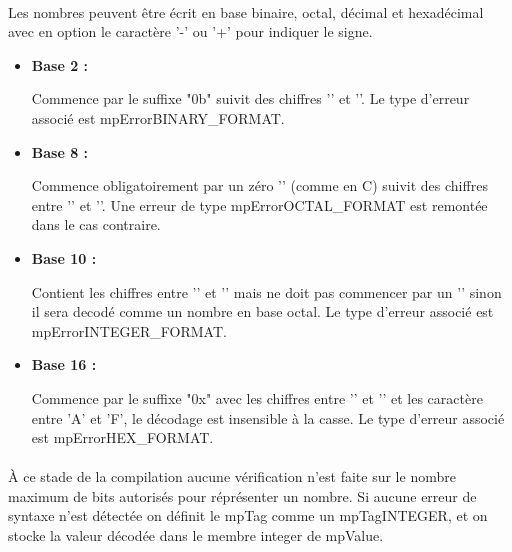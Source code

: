 \documentclass[12pt]{report} %
\begin{document}
    \paragraph{}
    Les nombres peuvent être écrit en base binaire, octal, décimal et hexadécimal avec en option le caractère '{\ttfamily -}' ou '{\ttfamily +}' pour indiquer le signe.
    \begin{itemize}
        \setlength\itemsep{1em}

        \item \textbf{Base 2 :}

        Commence par le suffixe "{\ttfamily 0b}" suivit des chiffres '{}' et '{}'. Le type d'erreur associé est {\ttfamily mpErrorBINARY\_FORMAT}.

        \item \textbf{Base 8 :}

        Commence obligatoirement par un zéro '{}' (comme en {\ttfamily C}) suivit des chiffres entre '{}' et '{}'. Une erreur de type {\ttfamily mpErrorOCTAL\_FORMAT} est remontée dans le cas contraire.

        \item \textbf{Base 10 :}

        Contient les chiffres entre '{}' et '{}' mais ne doit pas commencer par un '{}' sinon il sera decodé comme un nombre en base octal. Le type d'erreur associé est {\ttfamily mpErrorINTEGER\_FORMAT}.

        \item \textbf{Base 16 :}

        Commence par le suffixe "{\ttfamily 0x}" avec les chiffres entre '{}' et '{}' et les caractère entre '{\ttfamily A}' et '{\ttfamily F}', le décodage est insensible à la casse. Le type d'erreur associé est {\ttfamily mpErrorHEX\_FORMAT}.
    \end{itemize}

    \paragraph{} À ce stade de la compilation aucune vérification n'est faite sur le nombre maximum de bits autorisés pour réprésenter un nombre. Si aucune erreur de syntaxe n'est détectée on définit le {\ttfamily mpTag} comme un {\ttfamily mpTagINTEGER}, et on stocke la valeur décodée dans le membre {\ttfamily integer} de {\ttfamily mpValue}.
\end{document}

